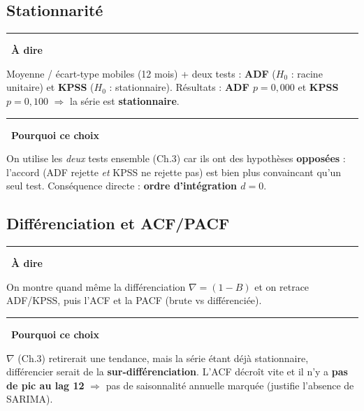 \documentclass[11pt,a4paper]{article}
\newenvironment{say}{\par\medskip\noindent\textcolor{blue!45!black}{\rule[-1pt]{3pt}{12pt}}\
  \textbf{\textcolor{blue!45!black}{À dire}}\par\nopagebreak\smallskip\noindent\ignorespaces}{\par\medskip}
\newenvironment{why}{\par\medskip\noindent\textcolor{orange!60!black}{\rule[-1pt]{3pt}{12pt}}\
  \textbf{\textcolor{orange!60!black}{Pourquoi ce choix}}\par\nopagebreak\smallskip\noindent\ignorespaces}{\par\medskip}
\begin{document}
\subsection{Stationnarité}
\begin{say}
Moyenne / écart-type mobiles (12 mois) + deux tests : \textbf{ADF} ($H_0$ : racine unitaire) et
\textbf{KPSS} ($H_0$ : stationnaire). Résultats : \textbf{ADF $p=0{,}000$} et \textbf{KPSS
$p=0{,}100$} $\Rightarrow$ la série est \textbf{stationnaire}.
\end{say}
\begin{why}
On utilise les \emph{deux} tests ensemble (Ch.3) car ils ont des hypothèses \textbf{opposées} :
l'accord (ADF rejette \emph{et} KPSS ne rejette pas) est bien plus convaincant qu'un seul test.
Conséquence directe : \textbf{ordre d'intégration $d=0$}.
\end{why}

\subsection{Différenciation et ACF/PACF}
\begin{say}
On montre quand même la différenciation $\nabla = (1-B)$ et on retrace ADF/KPSS, puis l'ACF et la
PACF (brute vs différenciée).
\end{say}
\begin{why}
$\nabla$ (Ch.3) retirerait une tendance, mais la série étant déjà stationnaire, différencier
serait de la \textbf{sur-différenciation}. L'ACF décroît vite et il n'y a \textbf{pas de pic au
lag 12} $\Rightarrow$ pas de saisonnalité annuelle marquée (justifie l'absence de SARIMA).
\end{why}
\end{document}
